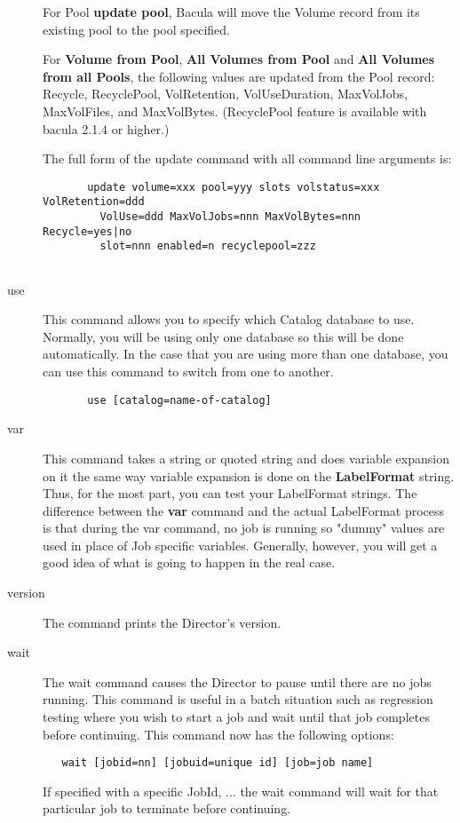 \begin{description}
   For Pool {\bf update pool}, Bacula will move the Volume record from its
   existing pool to the pool specified.

   For {\bf Volume from Pool}, {\bf All Volumes from Pool} and {\bf All Volumes
     from all Pools}, the following values are updated from the Pool record:
   Recycle, RecyclePool, VolRetention, VolUseDuration, MaxVolJobs, MaxVolFiles,
   and MaxVolBytes.  (RecyclePool feature is available with bacula 2.1.4 or
   higher.)

   The full form of the update command with all command line arguments is:

\footnotesize
\begin{verbatim}
       update volume=xxx pool=yyy slots volstatus=xxx VolRetention=ddd
         VolUse=ddd MaxVolJobs=nnn MaxVolBytes=nnn Recycle=yes|no
         slot=nnn enabled=n recyclepool=zzz
      
\end{verbatim}
\normalsize

\item [use]
   This command allows you to specify which Catalog  database to use. Normally,
you will be using only one database so  this will be done automatically. In
the case that you are using  more than one database, you can use this command
to switch from  one to another.  

\footnotesize
\begin{verbatim}
       use [catalog=name-of-catalog]
\end{verbatim}
\normalsize

\item [var]
   \label{var}
   This command takes a string or quoted string and  does variable expansion on
   it the same way variable expansion  is done on the {\bf LabelFormat} string.
   Thus, for the  most part, you can test your LabelFormat strings. The
   difference  between the {\bf var} command and the actual LabelFormat process 
   is that during the var command, no job is running so "dummy"  values are
   used in place of Job specific variables. Generally,  however, you will get a
   good idea of what is going to happen  in the real case.  

\item [version]
   The command prints the Director's version.  

\item [wait]
   The wait command causes the Director to pause  until there are no jobs
   running. This command is useful in  a batch situation such as regression
   testing where you  wish to start a job and wait until that job completes 
   before continuing. This command now has the following options:
\footnotesize
\begin{verbatim}
   wait [jobid=nn] [jobuid=unique id] [job=job name]
\end{verbatim}
\normalsize
   If specified with a specific JobId, ... the wait command will wait
   for that particular job to terminate before continuing.

\end{description}

